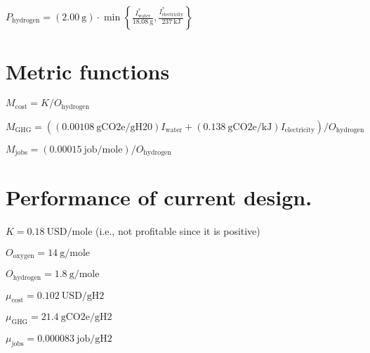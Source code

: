 \documentclass[letterpaper,10pt,english]{sphinxmanual}
\begin{document}
\(P_\mathrm{hydrogen} = \left( 2.00~\mathrm{g} \right) \cdot \min \left\{ \frac{I^*_\mathrm{water}}{18.08~\mathrm{g}}, \frac{I^*_\mathrm{electricity}}{237~\mathrm{kJ}} \right\}\)


\section{Metric functions}
\label{\detokenize{example-technology:metric-functions}}
\(M_\mathrm{cost} = K / O_\mathrm{hydrogen}\)

\(M_\mathrm{GHG} = \left( \left( 0.00108~\mathrm{gCO2e/gH20} \right) I_\mathrm{water} + \left( 0.138~\mathrm{gCO2e/kJ} \right) I_\mathrm{electricity} \right) / O_\mathrm{hydrogen}\)

\(M_\mathrm{jobs} = \left( 0.00015~\mathrm{job/mole} \right) / O_\mathrm{hydrogen}\)


\section{Performance of current design.}
\label{\detokenize{example-technology:performance-of-current-design}}
\(K = 0.18~\mathrm{USD/mole}\) (i.e., not profitable since it is
positive)

\(O_\mathrm{oxygen} = 14~\mathrm{g/mole}\)

\(O_\mathrm{hydrogen} = 1.8~\mathrm{g/mole}\)

\(\mu_\mathrm{cost} = 0.102~\mathrm{USD/gH2}\)

\(\mu_\mathrm{GHG} = 21.4~\mathrm{gCO2e/gH2}\)

\(\mu_\mathrm{jobs} = 0.000083~\mathrm{job/gH2}\)
\end{document}
